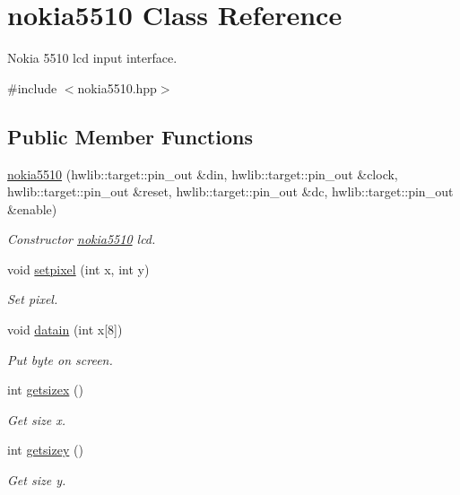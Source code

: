 \hypertarget{classnokia5510}{}\section{nokia5510 Class Reference}
\label{classnokia5510}


Nokia 5510 lcd input interface.  




{\ttfamily \#include $<$nokia5510.\+hpp$>$}

\subsection*{Public Member Functions}
\begin{DoxyCompactItemize}
\item 
\hyperlink{classnokia5510_a57aa12152d9123dcafe5fc9713b9f476}{nokia5510} (hwlib\+::target\+::pin\+\_\+out \&din, hwlib\+::target\+::pin\+\_\+out \&clock, hwlib\+::target\+::pin\+\_\+out \&reset, hwlib\+::target\+::pin\+\_\+out \&dc, hwlib\+::target\+::pin\+\_\+out \&enable)
\begin{DoxyCompactList}\small\item\em Constructor \hyperlink{classnokia5510}{nokia5510} lcd. \end{DoxyCompactList}\item 
void \hyperlink{classnokia5510_aef73e226957277965439eefc5548379f}{setpixel} (int x, int y)
\begin{DoxyCompactList}\small\item\em Set pixel. \end{DoxyCompactList}\item 
void \hyperlink{classnokia5510_aacf7c115fb774ad4060c1b5beffea98d}{datain} (int x\mbox{[}8\mbox{]})
\begin{DoxyCompactList}\small\item\em Put byte on screen. \end{DoxyCompactList}\item 
int \hyperlink{classnokia5510_a9cb638455fd6aea43942c27f49a909f4}{getsizex} ()
\begin{DoxyCompactList}\small\item\em Get size x. \end{DoxyCompactList}\item 
int \hyperlink{classnokia5510_acd5e3c9d03129ce85e785ebb183b17f6}{getsizey} ()
\begin{DoxyCompactList}\small\item\em Get size y. \end{DoxyCompactList}\item 

\end{DoxyCompactItemize}
